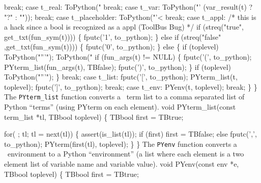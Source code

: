       break;
    case t_real:
      ToPython("%
      break;
    case t_var:
      ToPython("'%
               (var_result(t) ? "?" : ""));
      break;
    case t_placeholder:
      ToPython("'<%
      break;
    case t_appl:
      /* this is a hack since a bool is recognized as a appl (ToolBus Bug) */
      if (streq("true", get_txt(fun_sym(t)))) \{
        fputc('1', to_python);
      \} else if (streq("false" ,get_txt(fun_sym(t)))) \{
        fputc('0', to_python);
      \} else \{
        if (toplevel) ToPython("'''");
        ToPython("%
        if (fun_args(t) != NULL) \{
          fputc('(', to_python);
          PYterm_list(fun_args(t), TBfalse);
          fputc(')', to_python);
        \}
        if (toplevel) ToPython("'''");
      \}
      break;
    case t_list:
      fputc('[', to_python);
      PYterm_list(t, toplevel);
      fputc(']', to_python);
      break;
    case t_env:
      PYenv(t, toplevel);
      break;
  \}
\}
\nwendcode{}\nwdocspar
The \texttt{PYterm\_list} function converts a \TB\ term list to a
comma separated list of Python ``terms'' (using PYterm on each
element).
\nwenddocs{}\plusendmoddef\nwstartdeflinemarkup{}\nwenddeflinemarkup
void PYterm_list(const term_list *tl, TBbool toplevel) \{
  TBbool first = TBtrue;

  for( ; tl; tl = next(tl)) \{
    assert(is_list(tl));    
    if (first) first = TBfalse;
    else       fputc(',', to_python);
    PYterm(first(tl), toplevel);
  \}
\}
\nwendcode{}\nwdocspar
The \texttt{PYenv} function converts a \TB\ environment to a Python
``environment'' (a list where each element is a two element list of
variable name and variable value).
\nwenddocs{}\plusendmoddef\nwstartdeflinemarkup{}\nwenddeflinemarkup
void PYenv(const env *e, TBbool toplevel) \{
  TBbool first = TBtrue;

